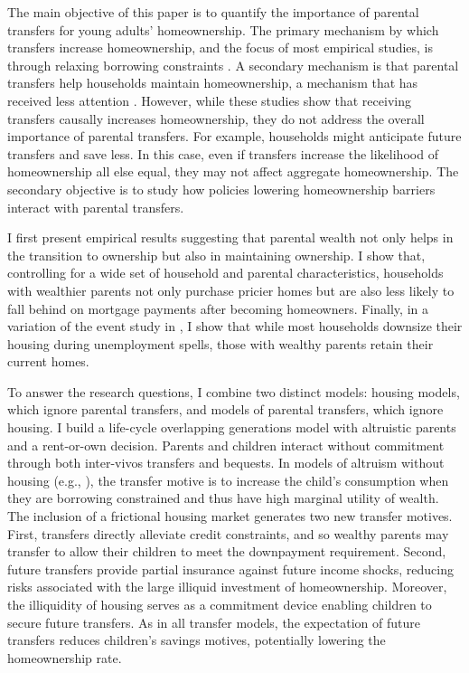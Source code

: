 \documentclass[12pt]{article}
\begin{document}
The main objective of this paper is to quantify the importance of parental transfers for young adults' homeownership. The primary mechanism by which transfers increase homeownership, and the focus of most empirical studies, is through relaxing borrowing constraints \citep[see e.g.,][]{Lee2018,Blickle2019,wold2024housing}. A secondary mechanism is that parental transfers help households maintain homeownership, a mechanism that has received less attention  \citep[see e.g.,][]{bond2021role}. However, while these studies show that receiving transfers causally increases homeownership, they do not address the overall importance of parental transfers. For example, households might anticipate future transfers and save less. In this case, even if transfers increase the likelihood of homeownership all else equal, they may not affect aggregate homeownership. The secondary objective is to study how policies lowering homeownership barriers interact with parental transfers. 

I first present empirical results suggesting that parental wealth not only helps in the transition to ownership but also in maintaining ownership. I show that, controlling for a wide set of household and parental characteristics, households with wealthier parents not only purchase pricier homes but are also less likely to fall behind on mortgage payments after becoming homeowners. Finally, in a variation of the event study in \cite{Chetty2007}, I show that while most households downsize their housing during unemployment spells, those with wealthy parents retain their current homes.

To answer the research questions, I combine two distinct models: housing models, which ignore parental transfers, and models of parental transfers, which ignore housing. I build a life-cycle overlapping generations model with altruistic parents and a rent-or-own decision. Parents and children  interact without commitment through both inter-vivos transfers and bequests. In models of altruism without housing (e.g., \citealp{Altonji1997a,Barczyk2014}), the transfer motive is to increase the child's consumption when they are borrowing constrained and thus have high marginal utility of wealth. The inclusion of a frictional housing market generates two new transfer motives. First, transfers directly alleviate credit constraints, and so wealthy parents may transfer to allow their children to meet the downpayment requirement. Second, future transfers provide partial insurance against future income shocks, reducing risks associated with the large illiquid investment of homeownership. Moreover, the illiquidity of housing serves as a commitment device enabling children to secure future transfers. As in all transfer models, the expectation of future transfers reduces children’s savings motives, potentially lowering the homeownership rate.
\end{document}
